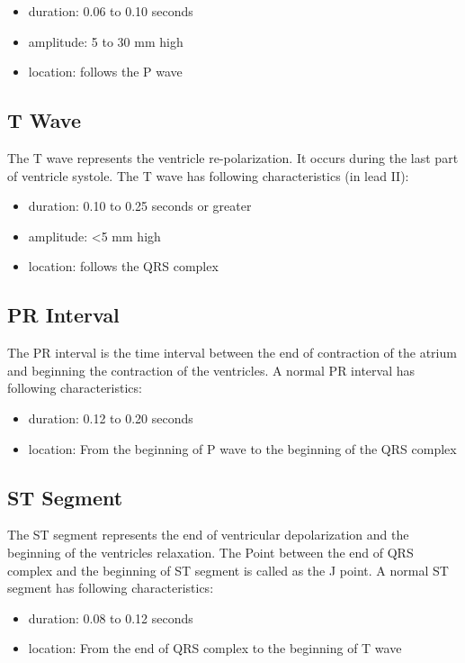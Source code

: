 \begin{itemize}
	\item duration: 0.06 to 0.10 seconds
	\item amplitude: 5 to 30 mm high
	\item location: follows the P wave
\end{itemize}

\subsection{T Wave}
The T wave represents the ventricle re-polarization. It occurs during the last part of ventricle systole. The T wave has following characteristics (in lead II):

\begin{itemize}
	\item duration: 0.10 to 0.25 seconds or greater
	\item amplitude: <5 mm high
	\item location: follows the QRS complex
\end{itemize}

\subsection{PR Interval}
The PR interval is the time interval between the end of contraction of the atrium and beginning the contraction of the ventricles. A normal PR interval has following characteristics:

\begin{itemize}
	\item duration: 0.12 to 0.20 seconds
	\item location: From the beginning of P wave to the beginning of the QRS complex
\end{itemize}

\subsection{ST Segment}
The ST segment represents the end of ventricular depolarization and the beginning of the ventricles relaxation. The Point between the end of QRS complex and the beginning of ST segment is called as the J point. A normal ST segment has following characteristics:

\begin{itemize}
	\item duration: 0.08 to 0.12 seconds
	\item location: From the end of QRS complex to the beginning of T wave
\end{itemize}

